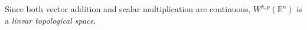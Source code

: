 \documentclass[12pt, reqno]{amsart}
\newtheorem{theorem}{Theorem}[section]
\theoremstyle{definition}
\numberwithin{equation}{section}
\newcommand{\dR}{{\mathbb R}}
\begin{document}
Since both vector addition and scalar multiplication are continuous, \(W^{k, p}(\dR^n)\) is a \emph{linear topological space}.
\begin{comment}

\subsection{Fixed Point Theorem} \hfill \\
The Fixed Point Theorem ensures that no matter how much you crumple, fold, or twist a map of a region within its boundaries, there will always be at least one point on the map that lands exactly over its corresponding real-world location.

Fixed point theorems are fundamental in various fields of mathematics and science, including analysis, topology, economics (especially in game theory and economic modeling), and computer science (like in the analysis of algorithms).

\begin{theorem}
    A \emph{Fixed Point Theorem} asserts that for certain types of functions and spaces, there exists at least one point within the domain of the function for which the value of the function at that point is equal to the point itself. Formally, if $f$ is a function from a set $X$ into itself, a point $x \in X$ is called a fixed point of $f$ if $f(x) = x$. The theorem can be stated for various contexts and conditions. In this section, we focus on Banach Fixed Point Theorem.
    
    \textbf{Banach Fixed Point Theorem:} If $X$ is a complete metric space and $f: X \to X$ is a contraction (i.e., there exists a constant $c < 1$ such that $d(f(x), f(y)) \leq c \cdot d(x, y)$ for all $x, y \in X$), then $f$ has exactly one fixed point and iteratively applying $f$ starting from any point in $X$ converges to this fixed point.

\end{theorem}

\begin{proof}
Choose any $x_0 \in X$ and define a sequence $(x_n)$ by setting $x_{n+1} = f(x_n)$ for all $n \geq 0$. We first show that $(x_n)$ is a Cauchy sequence.

Given any integers $m, n$ with $m > n$, we have:
\[
d(x_m, x_n) = d(f(x_{m-1}), f(x_{n-1})) \leq c \cdot d(x_{m-1}, x_{n-1}) \leq \cdots \leq c^{m-n} \cdot d(x_1, x_0).
\]
Since $c < 1$, as $m, n \to \infty$, $c^{m-n} \to 0$. Thus, $d(x_m, x_n) \to 0$, showing that $(x_n)$ is Cauchy.


\end{comment}
\end{document}

